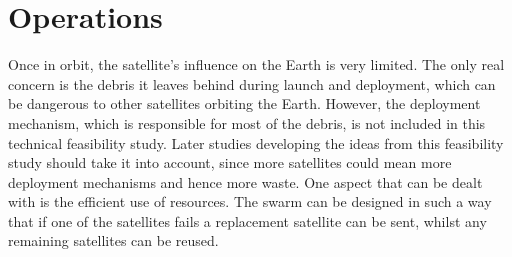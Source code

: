 \section{Operations}
\label{SSOPE}

Once in orbit, the satellite's influence on the Earth is very limited. The only real concern is the debris it leaves behind during launch and deployment, which can be dangerous to other satellites orbiting the Earth.
However, the deployment mechanism, which is responsible for most of the debris, is not included in this technical feasibility study. Later studies developing the ideas from this feasibility study should take it into account, since more satellites could mean more deployment mechanisms and hence more waste.
One aspect that can be dealt with is the efficient use of resources. The swarm can be designed in such a way that if one of the satellites fails a replacement satellite can be sent, whilst any remaining satellites can be reused.
